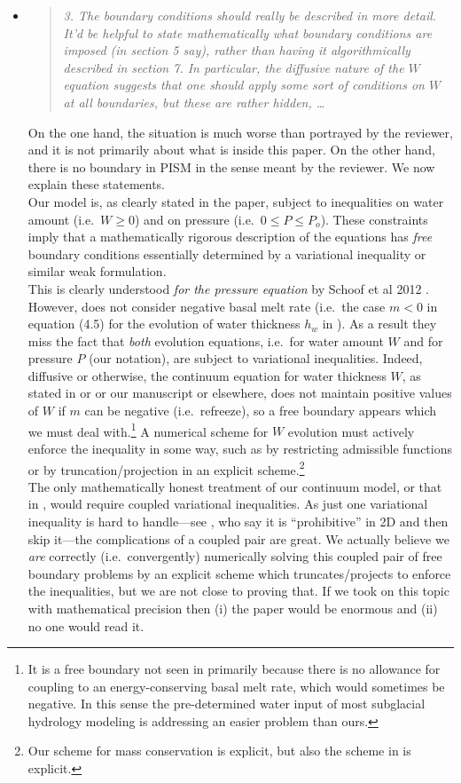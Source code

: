 \documentclass[11pt,reqno]{amsart}
\newcommand{\reply}[2]{
\medskip\medskip
\item  \begin{quote}
\emph{#1}
\end{quote}

\medskip
\noindent #2}
\begin{document}
\begin{itemize}
\reply{3. The boundary conditions should really be described in more detail.  It'd be helpful to state mathematically what boundary conditions are imposed (in section 5 say), rather than having it algorithmically described in section 7.  In particular, the diffusive nature of the $W$ equation suggests that one should apply some sort of conditions on $W$ at all boundaries, but these are rather hidden, \dots}
{On the one hand, the situation is much worse than portrayed by the reviewer, and it is not primarily about what is inside this paper.  On the other hand, there is no boundary in PISM in the sense meant by the reviewer.  We now explain these statements.\\
\indent Our model is, as clearly stated in the paper, subject to inequalities on water amount (i.e.~$W\ge 0$) and on pressure (i.e.~$0\le P \le P_o$).  These constraints imply that a mathematically rigorous description of the equations has \emph{free} boundary conditions essentially determined by a variational inequality or similar weak formulation.\\
\indent This is clearly understood \emph{for the pressure equation} by Schoof et al 2012 \cite{Schoofetal2012}.  However, \cite{Schoofetal2012} does not consider negative basal melt rate (i.e.~the case $m<0$ in equation (4.5) for the evolution of water thickness $h_w$ in \cite{Schoofetal2012}).  As a result they miss the fact that \emph{both} evolution equations, i.e.~for water amount $W$ and for pressure $P$ (our notation), are subject to variational inequalities.  Indeed, diffusive or otherwise, the continuum equation for water thickness $W$, as stated in \cite{Schoofetal2012} or \cite{Hewitt2011} or our manuscript or elsewhere, does not maintain positive values of $W$ if $m$ can be negative (i.e.~refreeze), so a free boundary appears which we must deal with.\footnote{It is a free boundary not seen in \cite{Schoofetal2012} primarily because there is no allowance for coupling to an energy-conserving basal melt rate, which would sometimes be negative.  In this sense the pre-determined water input of most subglacial hydrology modeling is addressing an easier problem than ours.}  A numerical scheme for $W$ evolution must actively enforce the inequality in some way, such as by restricting admissible functions or by truncation/projection in an explicit scheme.\footnote{Our scheme for mass conservation is explicit, but also the scheme in \cite{Schoofetal2012} is explicit.} \\
\indent The only mathematically honest treatment of our continuum model, or that in \cite{Schoofetal2012}, would require coupled variational inequalities.  As just one variational inequality is hard to handle---see \cite{Werderetal2013}, who say it is ``prohibitive'' in 2D and then skip it---the complications of a coupled pair are great.  We actually believe we \emph{are} correctly (i.e.~convergently) numerically solving this coupled pair of free boundary problems by an explicit scheme which truncates/projects to enforce the inequalities, but we are not close to proving that.  If we took on this topic with mathematical precision then (i) the paper would be enormous and (ii) no one would read it. \\
}
\end{itemize}
\end{document}
